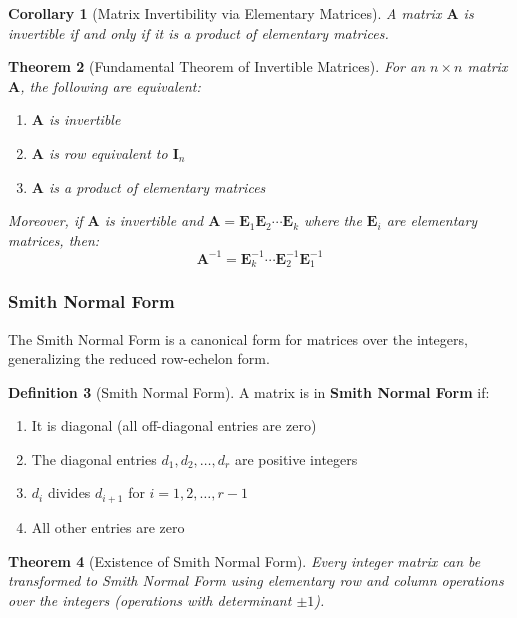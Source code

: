 \documentclass[12pt]{article}
\numberwithin{equation}{section}
\newcommand{\mat}[1]{\mathbf{#1}}        %
\theoremstyle{plain}
\newtheorem{theorem}{Theorem}[section]
\newtheorem{corollary}[theorem]{Corollary}
\theoremstyle{definition}
\newtheorem{definition}[theorem]{Definition}
\theoremstyle{remark}
\begin{document}
\begin{corollary}[Matrix Invertibility via Elementary Matrices]
A matrix $\mat{A}$ is invertible if and only if it is a product of elementary matrices.
\end{corollary}

\begin{theorem}[Fundamental Theorem of Invertible Matrices]
For an $n \times n$ matrix $\mat{A}$, the following are equivalent:
\begin{enumerate}
\item $\mat{A}$ is invertible
\item $\mat{A}$ is row equivalent to $\mat{I}_n$
\item $\mat{A}$ is a product of elementary matrices
\end{enumerate}
Moreover, if $\mat{A}$ is invertible and $\mat{A} = \mat{E}_1\mat{E}_2 \cdots \mat{E}_k$ where the $\mat{E}_i$ are elementary matrices, then:
$$\mat{A}^{-1} = \mat{E}_k^{-1} \cdots \mat{E}_2^{-1}\mat{E}_1^{-1}$$
\end{theorem}

\subsubsection{Smith Normal Form}

The Smith Normal Form is a canonical form for matrices over the integers, generalizing the reduced row-echelon form.

\begin{definition}[Smith Normal Form]
A matrix is in \textbf{Smith Normal Form} if:
\begin{enumerate}
\item It is diagonal (all off-diagonal entries are zero)
\item The diagonal entries $d_1, d_2, \ldots, d_r$ are positive integers
\item $d_i$ divides $d_{i+1}$ for $i = 1, 2, \ldots, r-1$
\item All other entries are zero
\end{enumerate}
\end{definition}

\begin{theorem}[Existence of Smith Normal Form]
Every integer matrix can be transformed to Smith Normal Form using elementary row and column operations over the integers (operations with determinant $\pm 1$).
\end{theorem}
\end{document}
